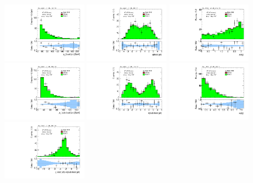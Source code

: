 \begin{figure}[tp]
  \includegraphics[width=0.32\textwidth]{figures/analysis/vbf-ZllCR/jet-1-pt}
  \includegraphics[width=0.32\textwidth]{figures/analysis/vbf-ZllCR/jet-1-eta}
  \includegraphics[width=0.32\textwidth]{figures/analysis/vbf-ZllCR/jets-dphi}
  \includegraphics[width=0.32\textwidth]{figures/analysis/vbf-ZllCR/jet-2-pt}
  \includegraphics[width=0.32\textwidth]{figures/analysis/vbf-ZllCR/jet-2-eta}
  \includegraphics[width=0.32\textwidth]{figures/analysis/vbf-ZllCR/jets-deta}
  \includegraphics[width=0.32\textwidth]{figures/analysis/vbf-ZllCR/jets-etaprod}

\end{figure}
